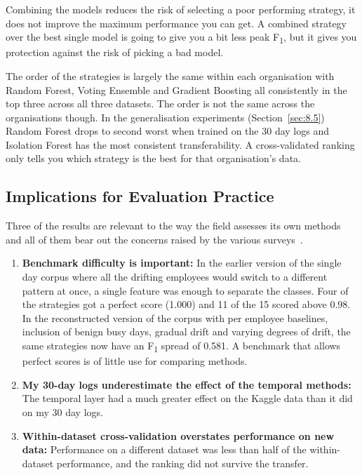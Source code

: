 \documentclass[a4paper,12pt]{article}
\begin{document}
Combining the models reduces the risk of selecting a poor performing strategy, it does not improve the maximum performance you can get. A combined strategy over the best single model is going to give you a bit less peak F\textsubscript{1}, but it gives you protection against the risk of picking a bad model.

The order of the strategies is largely the same within each organisation with Random Forest, Voting Ensemble and Gradient Boosting all consistently in the top three across all three datasets. The order is not the same across the organisations though. In the generalisation experiments (Section~\ref{sec:8.5}) Random Forest drops to second worst when trained on the 30 day logs and Isolation Forest has the most consistent transferability. A cross-validated ranking only tells you which strategy is the best for that organisation's data.

\subsection{Implications for Evaluation Practice}
\label{sec:9.4}

Three of the results are relevant to the way the field assesses its own methods and all of them bear out the concerns raised by the various surveys~\cite{alzaabi2024,yuan2021,kim2020}.

\begin{enumerate}
  \item \textbf{Benchmark difficulty is important:} In the earlier version of the single day corpus where all the drifting employees would switch to a different pattern at once, a single feature was enough to separate the classes. Four of the strategies got a perfect score (1.000) and 11 of the 15 scored above 0.98. In the reconstructed version of the corpus with per employee baselines, inclusion of benign busy days, gradual drift and varying degrees of drift, the same strategies now have an F\textsubscript{1} spread of 0.581. A benchmark that allows perfect scores is of little use for comparing methods.
  \item \textbf{My 30-day logs underestimate the effect of the temporal methods:} The temporal layer had a much greater effect on the Kaggle data than it did on my 30 day logs.
  \item \textbf{Within-dataset cross-validation overstates performance on new data:} Performance on a different dataset was less than half of the within-dataset performance, and the ranking did not survive the transfer.
\end{enumerate}
\end{document}
